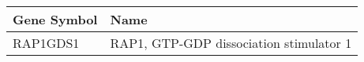 \begin{tabular}{ll}
\toprule
Gene Symbol &                                    Name \\
\midrule
   RAP1GDS1 & RAP1, GTP-GDP dissociation stimulator 1 \\
\bottomrule
\end{tabular}
